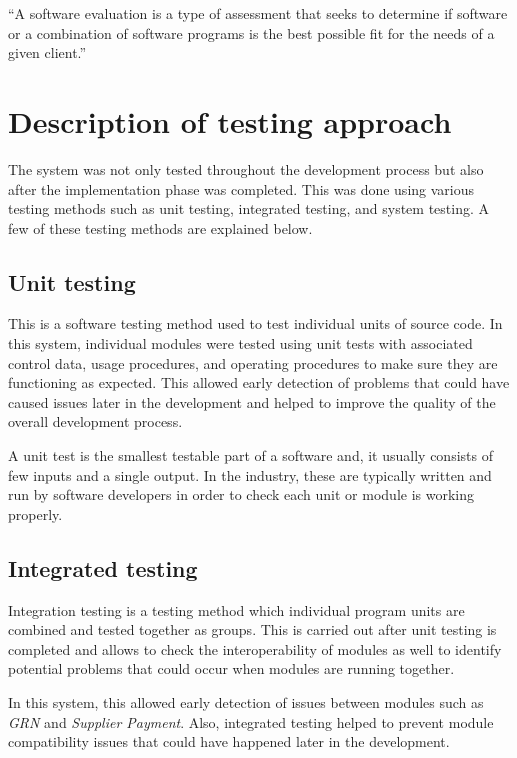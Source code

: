 \documentclass[12pt]{report}
\begin{document}
``A software evaluation is a type of assessment that seeks to determine if software or a combination of software programs is the best possible fit for the needs of a given client.''\cite{tatum_2020_software_evaluation}


\section{Description of testing approach}
The system was not only tested throughout the development process but also after the implementation phase was completed. This was done using various testing methods such as unit testing, integrated testing, and system testing.
A few of these testing methods are explained below.

\subsection{Unit testing}
This is a software testing method used to test individual units of source code. In this system, individual modules were tested using unit tests with associated control data, usage procedures, and operating procedures to make sure they are functioning as expected. This allowed early detection of problems that could have caused issues later in the development and helped to improve the quality of the overall development process.

A unit test is the smallest testable part of a software and, it usually consists of few inputs and a single output. In the industry, these are typically written and run by software developers in order to check each unit or module is working properly.

\subsection{Integrated testing}
Integration testing is a testing method which individual program units are combined and tested together as groups. This is carried out after unit testing is completed and allows to check the interoperability of modules as well to identify potential problems that could occur when modules are running together.

In this system, this allowed early detection of issues between modules such as {\it{GRN}} and {\it{Supplier Payment}}. Also, integrated testing helped to prevent module compatibility issues that could have happened later in the development.
\end{document}
